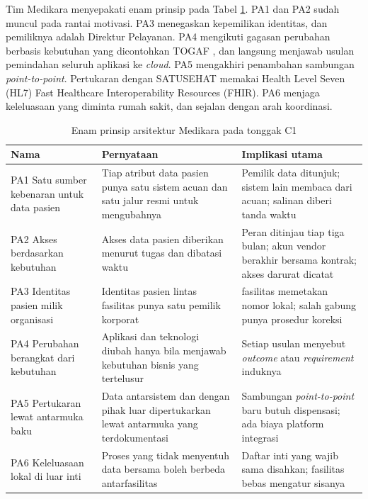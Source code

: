 \begin{kasus}[title={Kasus Medikara Health: Enam Prinsip Arsitektur C1}]
  Tim Medikara menyepakati enam prinsip pada Tabel \ref{tab:ch03-prinsip-medikara}.
  PA1 dan PA2 sudah muncul pada rantai motivasi. PA3 menegaskan kepemilikan identitas,
  dan pemiliknya adalah Direktur Pelayanan. PA4 mengikuti gagasan perubahan
  berbasis kebutuhan yang dicontohkan TOGAF \cite{togaf10}, dan langsung menjawab
  usulan pemindahan seluruh aplikasi ke \textit{cloud}. PA5 mengakhiri penambahan
  sambungan \textit{point-to-point}. Pertukaran dengan SATUSEHAT memakai Health Level
  Seven (HL7) Fast Healthcare Interoperability Resources (FHIR). PA6 menjaga
  keleluasaan yang diminta rumah sakit, dan sejalan dengan arah koordinasi.
\end{kasus}

\begin{table}[!htb]
  \centering
  \caption{Enam prinsip arsitektur Medikara pada tonggak C1}
  \label{tab:ch03-prinsip-medikara}
  \footnotesize
  \begin{tabularx}{\textwidth}{>{\raggedright\arraybackslash}p{2.5cm}*{2}{>{\raggedright\arraybackslash}X}}
    \hline
    \textbf{Nama} & \textbf{Pernyataan} & \textbf{Implikasi utama} \\
    \hline
    PA1 Satu sumber kebenaran untuk data pasien & Tiap atribut data pasien punya satu sistem acuan dan satu jalur resmi untuk mengubahnya & Pemilik data ditunjuk; sistem lain membaca dari acuan; salinan diberi tanda waktu \\
    \hline
    PA2 Akses berdasarkan kebutuhan & Akses data pasien diberikan menurut tugas dan dibatasi waktu & Peran ditinjau tiap tiga bulan; akun vendor berakhir bersama kontrak; akses darurat dicatat \\
    \hline
    PA3 Identitas pasien milik organisasi & Identitas pasien lintas fasilitas punya satu pemilik korporat & 36 fasilitas memetakan nomor lokal; salah gabung punya prosedur koreksi \\
    \hline
    PA4 Perubahan berangkat dari kebutuhan & Aplikasi dan teknologi diubah hanya bila menjawab kebutuhan bisnis yang tertelusur & Setiap usulan menyebut \textit{outcome} atau \textit{requirement} induknya \\
    \hline
    PA5 Pertukaran lewat antarmuka baku & Data antarsistem dan dengan pihak luar dipertukarkan lewat antarmuka yang terdokumentasi & Sambungan \textit{point-to-point} baru butuh dispensasi; ada biaya platform integrasi \\
    \hline
    PA6 Keleluasaan lokal di luar inti & Proses yang tidak menyentuh data bersama boleh berbeda antarfasilitas & Daftar inti yang wajib sama disahkan; fasilitas bebas mengatur sisanya \\
    \hline
  \end{tabularx}
\end{table}

